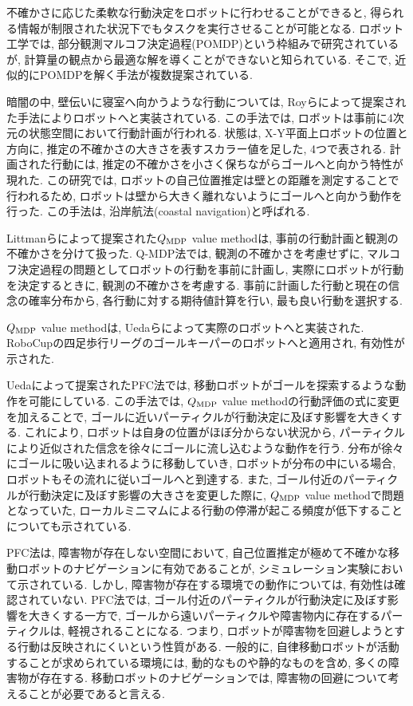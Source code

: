 不確かさに応じた柔軟な行動決定をロボットに行わせることができると, 得られる情報が制限された状況下でもタスクを実行させることが可能となる. 
ロボット工学では, 部分観測マルコフ決定過程(POMDP)という枠組みで研究されているが, 計算量の観点から最適な解を導くことができないと知られている\cite{kaelbling1998}. 
そこで, 近似的にPOMDPを解く手法が複数提案されている. 

暗闇の中, 壁伝いに寝室へ向かうような行動については, Royらによって提案された手法によりロボットへと実装されている\cite{roy1999b}. 
この手法では, ロボットは事前に4次元の状態空間において行動計画が行われる. 
状態は, X-Y平面上ロボットの位置と方向に, 推定の不確かさの大きさを表すスカラー値を足した, 4つで表される. 
計画された行動には, 推定の不確かさを小さく保ちながらゴールへと向かう特性が現れた. 
この研究では, ロボットの自己位置推定は壁との距離を測定することで行われるため, ロボットは壁から大きく離れないようにゴールへと向かう動作を行った. 
この手法は, 沿岸航法(coastal navigation)と呼ばれる. 

Littmanらによって提案された$Q_{\rm MDP}$ value method\cite{littman1995}は, 事前の行動計画と観測の不確かさを分けて扱った. 
Q-MDP法では, 観測の不確かさを考慮せずに, マルコフ決定過程の問題としてロボットの行動を事前に計画し, 
実際にロボットが行動を決定するときに, 観測の不確かさを考慮する. 
事前に計画した行動と現在の信念の確率分布から, 各行動に対する期待値計算を行い, 最も良い行動を選択する. 

$Q_{\rm MDP}$ value methodは, Uedaらによって実際のロボットへと実装された\cite{ueda2003iros}. 
RoboCupの四足歩行リーグのゴールキーパーのロボットへと適用され, 有効性が示された. 

Uedaによって提案されたPFC法では, 移動ロボットがゴールを探索するような動作を可能にしている\cite{ueda2015}. 
この手法では, $Q_{\rm MDP}$ value methodの行動評価の式に変更を加えることで, ゴールに近いパーティクルが行動決定に及ぼす影響を大きくする. 
これにより, ロボットは自身の位置がほぼ分からない状況から, パーティクルにより近似された信念を徐々にゴールに流し込むような動作を行う. 
分布が徐々にゴールに吸い込まれるように移動していき, ロボットが分布の中にいる場合, ロボットもその流れに従いゴールへと到達する. 
また, ゴール付近のパーティクルが行動決定に及ぼす影響の大きさを変更した際に, 
$Q_{\rm MDP}$ value methodで問題となっていた, ローカルミニマムによる行動の停滞が起こる頻度が低下することについても示されている\cite{ueda2018searching}. 

PFC法は, 障害物が存在しない空間において, 自己位置推定が極めて不確かな移動ロボットのナビゲーションに有効であることが, シミュレーション実験において示されている. 
しかし, 障害物が存在する環境での動作については, 有効性は確認されていない. 
PFC法では, ゴール付近のパーティクルが行動決定に及ぼす影響を大きくする一方で, 
ゴールから遠いパーティクルや障害物内に存在するパーティクルは, 軽視されることになる. 
つまり, ロボットが障害物を回避しようとする行動は反映されにくいという性質がある. 
一般的に, 自律移動ロボットが活動することが求められている環境には, 動的なものや静的なものを含め, 多くの障害物が存在する. 
移動ロボットのナビゲーションでは, 障害物の回避について考えることが必要であると言える. 


